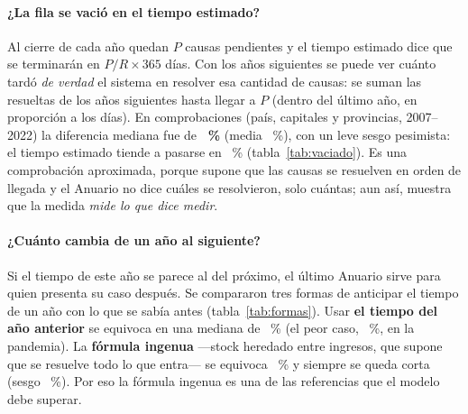 \documentclass[11pt,a4paper]{article}
\begin{document}
\paragraph{¿La fila se vació en el tiempo estimado?} Al cierre de cada año quedan $P$ causas pendientes y el tiempo
estimado dice que se terminarán en $P/R\times365$ días. Con los años siguientes se puede ver cuánto tardó \emph{de
verdad} el sistema en resolver esa cantidad de causas: se suman las resueltas de los años siguientes hasta llegar a $P$
(dentro del último año, en proporción a los días). En \histNVaciado{} comprobaciones (país, capitales y provincias,
2007--2022) la diferencia mediana fue de \textbf{\histErrVaciado~\%} (media \histErrVaciadoMedio~\%), con un leve sesgo
pesimista: el tiempo estimado tiende a pasarse en \histSesgoVaciado~\% (tabla~\ref{tab:vaciado}). Es una comprobación
aproximada, porque supone que las causas se resuelven en orden de llegada y el Anuario no dice cuáles se resolvieron,
solo cuántas; aun así, muestra que la medida \emph{mide lo que dice medir}.

\begin{table}[H]
  \centering\small
  \caption{El país: tiempo estimado al cierre de cada año y lo que la fila de verdad tardó en vaciarse con las
  resoluciones de los años siguientes. Notebook 19.}
  \label{tab:vaciado}
  
\end{table}

\paragraph{¿Cuánto cambia de un año al siguiente?} Si el tiempo de este año se parece al del próximo, el último Anuario
sirve para quien presenta su caso después. Se compararon tres formas de anticipar el tiempo de un año con lo que se sabía
antes (tabla~\ref{tab:formas}). Usar \textbf{el tiempo del año anterior} se equivoca en una mediana de
\histErrAnterior~\% (el peor caso, \histPeorAnterior~\%, en la pandemia). La \textbf{fórmula ingenua} ---stock heredado
entre ingresos, que supone que se resuelve todo lo que entra--- se equivoca \histErrIngenua~\% y siempre se queda corta
(sesgo \histSesgoIngenua~\%). Por eso la fórmula ingenua es una de las referencias que el modelo debe superar.

\begin{table}[H]
  \centering\small
  \caption{Tres formas de anticipar el tiempo de un año, comprobadas con la serie 2007--2023 (país, capitales y
  provincias). Error porcentual respecto del tiempo real del año. Notebook 19.}
  \label{tab:formas}
  \resizebox{\linewidth}{!}{}
\end{table}
\end{document}
